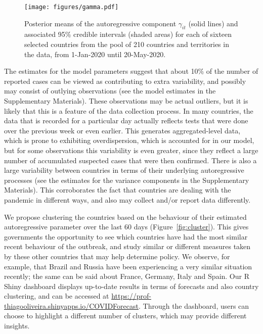 \documentclass[fleqn,10pt]{wlscirep}
\begin{document}
\begin{figure}[ht!]
    \centering
    \texttt{[image: figures/gamma.pdf]}
    \caption{Posterior means of the autoregressive component $\gamma_{it}$ (solid lines) and associated 95\% credible intervals (shaded areas) for each of sixteen selected countries from the pool of 210 countries and territories in the data, from 1-Jan-2020 until 20-May-2020.}
    \label{fig:gamma}
\end{figure}

The estimates for the model parameters suggest that about 10\% of the number of reported cases can be viewed as contributing to extra variability, and possibly may consist of outlying observations (see the model estimates in the Supplementary Materials). These observations may be actual outliers, but it is likely that this is a feature of the data collection process. In many countries, the data that is recorded for a particular day actually reflects tests that were done over the previous week or even earlier. This generates aggregated-level data, which is prone to exhibiting overdispersion, which is accounted for in our model, but for some observations this variability is even greater, since they reflect a large number of accumulated suspected cases that were then confirmed. There is also a large variability between countries in terms of their underlying autoregressive processes (see the estimates for the variance components in the Supplementary Materials). This corroborates the fact that countries are dealing with the pandemic in different ways, and also may collect and/or report data differently.

We propose clustering the countries based on the behaviour of their estimated autoregressive parameter over the last 60 days (Figure~\ref{fig:cluster}). This gives governments the opportunity to see which countries have had the most similar recent behaviour of the outbreak, and study similar or different measures taken by these other countries that may help determine policy. We observe, for example, that Brazil and Russia have been experiencing a very similar situation recently; the same can be said about France, Germany, Italy and Spain. Our R Shiny dashboard displays up-to-date results in terms of forecasts and also country clustering, and can be accessed at \href{https://prof-thiagooliveira.shinyapps.io/COVIDForecast}{https://prof-thiagooliveira.shinyapps.io/COVIDForecast}. Through the dashboard, users can choose to highlight a different number of clusters, which may provide different insights.
\end{document}
